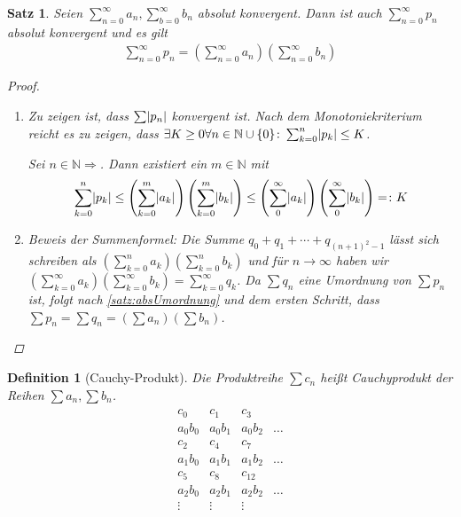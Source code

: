 \documentclass[ngerman,titlepage,twoside, parskip=half*]{scrreprt}
\newcommand*{\N}{\mathbb{N}}
\theoremstyle{break}
\newtheorem{theorem}{Satz}[section]
\newtheorem{definition}{Definition}[chapter]
\theoremstyle{nonumberbreak}
\newtheorem{proof}{Beweis:}
\DeclarePairedDelimiter{\abs}{\lvert}{\rvert}
\begin{document}
\begin{theorem}\label{satz:abskonvReihe}
  Seien $\sum_{n=0}^\infty a_n, \sum_{b=0}^\infty b_n$ absolut konvergent.
  Dann ist auch $\sum_{n=0}^\infty p_n$ absolut konvergent und es gilt
  \begin{gather*}
    \sum_{n=0}^\infty p_n=\left(\sum_{n=0}^\infty
       a_n\right)\left(\sum_{n=0}^\infty b_n\right)
  \end{gather*}
  \begin{proof}
    \begin{enumerate}[1.\,Schr{i}tt]
     \item Zu zeigen ist, dass $\sum \abs{p_n}$ konvergent ist. Nach dem
      Monotoniekriterium reicht es zu zeigen, dass $\exists K \geq 0 \forall n
      \in \N \cup \{0\}\colon \sum_{k=0}^n \abs{p_k}\leq K$.

      Sei $n \in \N \Rightarrow$. Dann existiert ein $m \in \N$ mit
      \begin{gather*}
	\sum_{k=0}^n \abs{p_k}
      \leq \left(\sum_{k=0}^m \abs{a_k}\right)\left(\sum_{k=0}^m
      \abs{b_k}\right) \leq \left(\sum_0^\infty
      \abs{a_k}\right)\left(\sum_0^\infty \abs{b_k}\right)=\colon K
      \end{gather*}
      
  \item Beweis der Summenformel:
    Die Summe $q_0+q_1+\cdots +q_{(n+1)^2-1}$ lässt sich schreiben als
      $(\sum_{k=0}^n a_k)(\sum_{k=0}^n b_k)$ und für $n\rightarrow \infty$
      haben wir $(\sum_{k=0}^\infty
      a_k)(\sum_{k=0}^\infty b_k) =\sum_{k=0}^\infty q_k$. Da $\sum q_n$ eine
      Umordnung von $\sum p_n$ ist, folgt nach \autoref{satz:absUmordnung} und
      dem ersten Schritt, dass $\sum p_n=\sum q_n = (\sum a_n)(\sum b_n)$.
\end{enumerate}
  \end{proof}
\end{theorem}

\begin{definition}[Cauchy-Produkt]
  Die Produktreihe $\sum c_n$ heißt \emph{Cauchyprodukt}
  der Reihen $\sum a_n, \sum b_n$.
  \begin{gather*}
    \begin{matrix}
      c_{0}& c_{1}& c_{3}&\\
      a_{0}b_{0}& a_{0}b_{1}& a_{0}b_{2}& \dotso\\
      c_{2}& c_{4}& c_{7}&\\
      a_{1}b_{0}& a_{1}b_{1}& a_{1}b_{2}& \dotso \\
      c_{5}& c_{8}& c_{12}& \\
      a_{2}b_{0}& a_{2}b_{1}& a_{2}b_{2}& \dotso \\
      \vdots& \vdots& \vdots
    \end{matrix}
  \end{gather*}
\end{definition}
\end{document}
